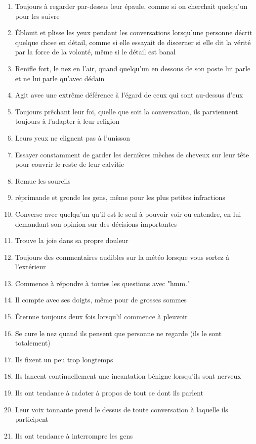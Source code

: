 \documentclass{article}
\begin{document}
\begin{multicols}{2}
\begin{enumerate}
		\item Toujours à regarder par-dessus leur épaule, comme si on cherchait quelqu'un pour les suivre
		\item Éblouit et plisse les yeux pendant les conversations lorsqu'une personne décrit quelque chose en détail, comme si elle essayait de discerner si elle dit la vérité par la force de la volonté, même si le détail est banal
		\item Renifle fort, le nez en l'air, quand quelqu'un en dessous de son poste lui parle et ne lui parle qu'avec dédain
		\item Agit avec une extrême déférence à l'égard de ceux qui sont au-dessus d'eux
		\item Toujours prêchant leur foi, quelle que soit la conversation, ils parviennent toujours à l'adapter à leur religion
		\item Leurs yeux ne clignent pas à l'unisson
		\item Essayer constamment de garder les dernières mèches de cheveux sur leur tête pour couvrir le reste de leur calvitie
		\item Remue les sourcils
		\item réprimande et gronde les gens, même pour les plus petites infractions
		\item Converse avec quelqu'un qu'il est le seul à pouvoir voir ou entendre, en lui demandant son opinion sur des décisions importantes
		\item Trouve la joie dans sa propre douleur
		\item Toujours des commentaires audibles sur la météo lorsque vous sortez à l'extérieur
		\item Commence à répondre à toutes les questions avec "hmm."
		\item Il compte avec ses doigts, même pour de grosses sommes
		\item Éternue toujours deux fois lorsqu'il commence à pleuvoir
		\item Se cure le nez quand ils pensent que personne ne regarde (ils le sont totalement)
		\item Ils fixent un peu trop longtemps
		\item Ils lancent continuellement une incantation bénigne lorsqu'ils sont nerveux
		\item Ils ont tendance à radoter à propos de tout ce dont ils parlent
		\item Leur voix tonnante prend le dessus de toute conversation à laquelle ils participent
		\item Ils ont tendance à interrompre les gens

\end{enumerate}
\end{multicols}
\end{document}
